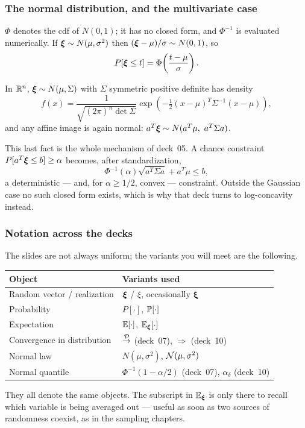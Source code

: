\documentclass[aspectratio=169]{beamer}
\providecommand{\bxi}{\boldsymbol{\xi}}
\begin{document}
\begin{frame}
\frametitle{The normal distribution, and the multivariate case}
\small

$\Phi$ denotes the cdf of $N(0,1)$; it has no closed form, and $\Phi^{-1}$ is evaluated numerically. If ${\boldsymbol{\xi}} \sim N(\mu, \sigma^2)$ then $({\boldsymbol{\xi}} - \mu)/\sigma \sim N(0,1)$, so
\[
P[{\boldsymbol{\xi}} \leq t] = \Phi\!\left( \frac{t-\mu}{\sigma} \right).
\]

\mbox{}

In ${\mathbb{R}}^n$, ${\boldsymbol{\xi}} \sim N(\mu, \Sigma)$ with $\Sigma$ symmetric positive definite has density
\[
f(x) = \frac{1}{\sqrt{(2\pi)^n \det \Sigma}}
\exp\left( -\tfrac{1}{2}(x-\mu)^T\Sigma^{-1}(x-\mu) \right),
\]
and {\red any affine image is again normal}: $a^T{\boldsymbol{\xi}} \sim N(a^T\mu,\ a^T\Sigma a)$.

\mbox{}

{\blue This last fact is the whole mechanism of deck~05.} A chance constraint $P[a^T{\boldsymbol{\xi}} \leq b] \geq \alpha$ becomes, after standardization,
\[
\Phi^{-1}(\alpha)\sqrt{a^T\Sigma a} + a^T\mu \leq b,
\]
a {\red deterministic} --- and, for $\alpha \geq 1/2$, convex --- constraint. Outside the Gaussian case no such closed form exists, which is why that deck turns to log-concavity instead.

\end{frame}

\begin{frame}
\frametitle{Notation across the decks}

The slides are not always uniform; the variants you will meet are the following.

\begin{center}
{\footnotesize
\begin{tabular}{|l|l|}
\hline
Object & Variants used \\
\hline
\hline
Random vector / realization & ${\boldsymbol{\xi}}$ / $\xi$, occasionally $\bxi$ \\
Probability & $P[\cdot]$, ${\mathbb{P}}[\cdot]$ \\
Expectation & ${\mathbb{E}}[\cdot]$, ${\mathbb{E}}_{{\boldsymbol{\xi}}}[\cdot]$ \\
Convergence in distribution & $\overset{{\mathcal{D}}}{\rightarrow}$ (deck~07), $\Rightarrow$ (deck~10) \\
Normal law & $N(\mu,\sigma^2)$, ${\mathcal{N}}(\mu,\sigma^2)$ \\
Normal quantile & $\Phi^{-1}(1-\alpha/2)$ (deck~07), $\alpha_{\delta}$ (deck~10) \\
\hline
\end{tabular}}
\end{center}

\mbox{}

They all denote the same objects. The subscript in ${\mathbb{E}}_{{\boldsymbol{\xi}}}$ is only there to recall {\red which} variable is being averaged out --- useful as soon as two sources of randomness coexist, as in the sampling chapters.

\end{frame}
\end{document}
